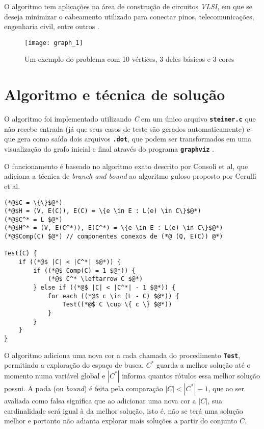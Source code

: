 \documentclass[12pt, a4paper]{article}
\newcommand{\ic}[1]{\textbf{\lstinline{#1}}}
\begin{document}
O algoritmo tem aplicações na área de construção de circuitos \emph{VLSI}, em
que se deseja minimizar o cabeamento utilizado para conectar pinos,
telecomunicações, engenharia civil, entre outros \cite{robins}.

\begin{figure}[H]
    \centering
    \texttt{[image: graph\_1]}
    \caption{Um exemplo do problema com 10 vértices, 3 deles básicos e 3 cores}
    \label{fig:graph_1}
\end{figure}

\section{Algoritmo e técnica de solução}
O algoritmo foi implementado utilizando \emph{C} em um único arquivo
\ic{steiner.c} que não recebe entrada (já que seus casos de teste são gerados
automaticamente) e que gera como saída dois arquivos \ic{.dot}, que podem ser
transformados em uma visualização do grafo inicial e final através do programa
\ic{graphviz} \cite{graphviz}.

O funcionamento é baseado no algoritmo exato descrito por Consoli et al, que
adiciona a técnica de \emph{branch and bound} ao algoritmo guloso proposto por
Cerulli et al. \cite{cerulli}

\begin{lstlisting}[caption=Pseudocódigo]
(*@$C = \{\}$@*)
(*@$H = (V, E(C)), E(C) = \{e \in E : L(e) \in C\}$@*)
(*@$C^* = L $@*)
(*@$H^* = (V, E(C^*)), E(C^*) = \{e \in E : L(e) \in C\}$@*)
(*@$Comp(C) $@*) // componentes conexos de (*@ (Q, E(C)) @*)

Test(C) {
    if ((*@$ |C| < |C^*| $@*)) {
        if ((*@$ Comp(C) = 1 $@*)) {
            (*@$ C^* \leftarrow C $@*)
        } else if ((*@$ |C| < |C^*| - 1 $@*)) {
            for each ((*@$ c \in (L - C) $@*)) {
                Test((*@$ C \cup \{ c \} $@*))
            }
        }
    }
}
\end{lstlisting}

O algoritmo adiciona uma nova cor a cada chamada do procedimento \ic{Test},
permitindo a exploração do espaço de busca. $ C^* $ guarda a melhor solução até
o momento numa variável global e $ |C^*| $ informa quantos rótulos essa melhor
solução possui. A poda (ou \emph{bound}) é feita pela comparação $ |C| < |C^*|
- 1 $, que ao ser avaliada como falsa significa que ao adicionar uma nova cor a
$ |C| $, sua cardinalidade será igual à da melhor solução, isto é, não se terá uma
solução melhor e portanto não adianta explorar mais soluções a partir do
conjunto $ C $.
\end{document}
